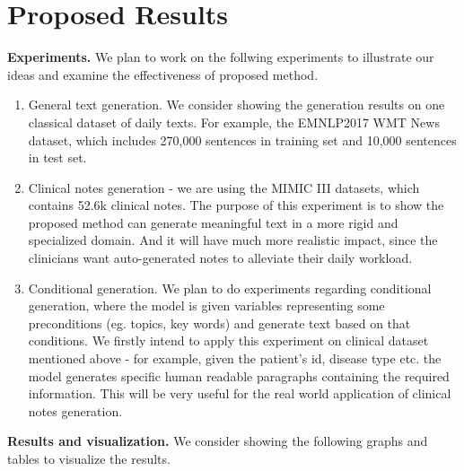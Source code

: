 \documentclass[12pt]{report}
\begin{document}
\section*{Proposed Results}
\textbf{Experiments.} We plan to work on the follwing experiments to illustrate our ideas and examine the effectiveness of proposed method.
\begin{enumerate}
    \item General text generation. We consider showing the generation results on one classical dataset of daily texts. For example, the EMNLP2017 WMT News dataset, which includes  270,000 sentences in training set and 10,000 sentences in test set.
    \item Clinical notes generation - we are using the MIMIC III datasets, which contains 52.6k clinical notes. The purpose of this experiment is to show the proposed method can generate meaningful text in a more rigid and specialized domain. And it will have much more realistic impact, since the clinicians want auto-generated notes to alleviate their daily workload. 
    \item Conditional generation. We plan to do experiments regarding conditional generation, where the model is given variables representing some preconditions (eg. topics, key words) and generate text based on that conditions. We firstly intend to apply this experiment on clinical dataset mentioned above - for example, given the patient's id, disease type etc. the model generates specific human readable paragraphs containing the required information. This will be very useful for the real world application of clinical notes generation.
\end{enumerate}

\textbf{Results and visualization.} We consider showing the following graphs and tables to visualize the results.
\end{document}
